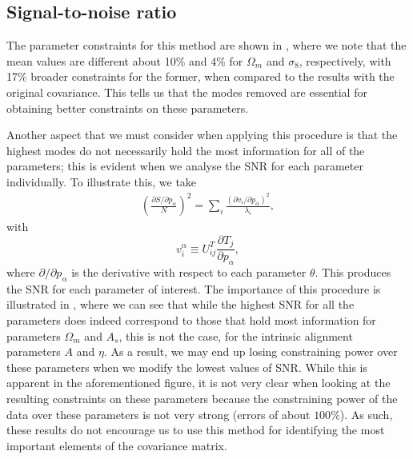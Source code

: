 \documentclass[twocolumn]{\docclass}
\newcommand\be{\begin{equation}}
\newcommand\ee{\end{equation}}
\def\bea{\begin{eqnarray}}
\def\eea{\end{eqnarray}}
\begin{document}
	
	
	
	\subsection{Signal-to-noise ratio}
	
	The parameter constraints for this method are shown in , where we note that the mean values are different about 10\% and 4\% for $\Omega_m$ and $\sigma_8$, respectively, with 17\% broader constraints for the former, when compared to the results with the original covariance. This tells us that the modes removed are essential for obtaining better constraints on these parameters. 
	
	Another aspect that we must consider when applying this procedure is that the highest modes do not necessarily hold the most information for all of the parameters; this is evident when we analyse the SNR for each parameter individually. To illustrate this, we take
	\bea
	\left(\frac{\partial S/\partial p_\alpha}{N}\right)^2 = \sum_{i} \frac{(\partial v_i / \partial p_\alpha)^2}{\lambda_i}
	,\eea
	with
	\be
	v_i^\alpha \equiv U_{ij}^T \frac{\partial T_j}{\partial p_\alpha}
	,\ee
	where $\partial /\partial p_\alpha$ is the derivative with respect to each parameter $\theta$. This produces the SNR for each parameter of interest. The importance of this procedure is illustrated in , where we can see that while the highest SNR for all the parameters does indeed correspond to those that hold most information for parameters $\Omega_m$ and $A_s$, this is not the case, for the intrinsic alignment parameters $A$ and $\eta$. As a result, we may end up losing constraining power over these parameters when we modify the lowest values of SNR. While this is apparent in the aforementioned figure, it is not very clear when looking at the resulting constraints on these parameters because the constraining power of the data over these parameters is not very strong (errors of about $100\%$). As such, these results do not encourage us to use this method for identifying the most important elements of the covariance matrix.
	
\end{document}
